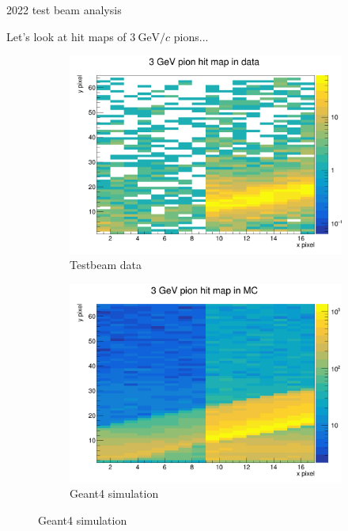 \documentclass[xcolor={dvipsnames}]{beamer}
\begin{document}
\begin{frame}{2022 test beam analysis}
  \begin{center}
    \Large{Let's look at hit maps of $\SI{3}{\giga\eV/c}$ pions...}
  \end{center}
  \begin{figure}
    \centering
    \begin{subfigure}{0.5\textwidth}
      \includegraphics[width = 1.0\textwidth]{Figs/HitMap_Pos8_Pion_3GeV_Data.png}
      \caption{Testbeam data}
    \end{subfigure}%
    \begin{subfigure}{0.5\textwidth}
      \includegraphics[width = 1.0\textwidth]{Figs/HitMap_Pos8_Pion_3GeV_MC.png}
      \caption{Geant4 simulation}
    \end{subfigure}%
  \end{figure}
\end{frame}
\end{document}
